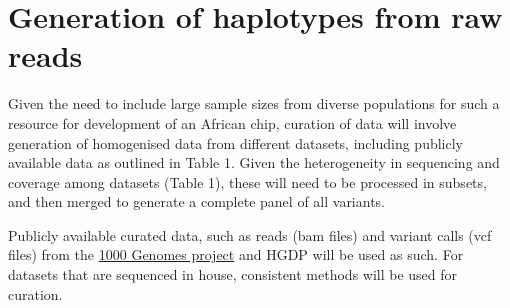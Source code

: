 \section{Generation of haplotypes from raw reads}
Given the need to include large sample sizes from diverse populations for such a resource for development of an African chip, curation of data will involve generation of homogenised data from different datasets, including publicly available data as outlined in Table 1. Given the heterogeneity in sequencing and coverage among datasets (Table 1), these will need to be processed in subsets, and then merged to generate a complete panel of all variants. 

Publicly available curated data, such as reads (bam files) and variant calls (vcf files) from the \href{http://www.1000genomes.org}{1000 Genomes project} and HGDP
will be used as such. For datasets that are sequenced in house, consistent methods will be used for curation.















